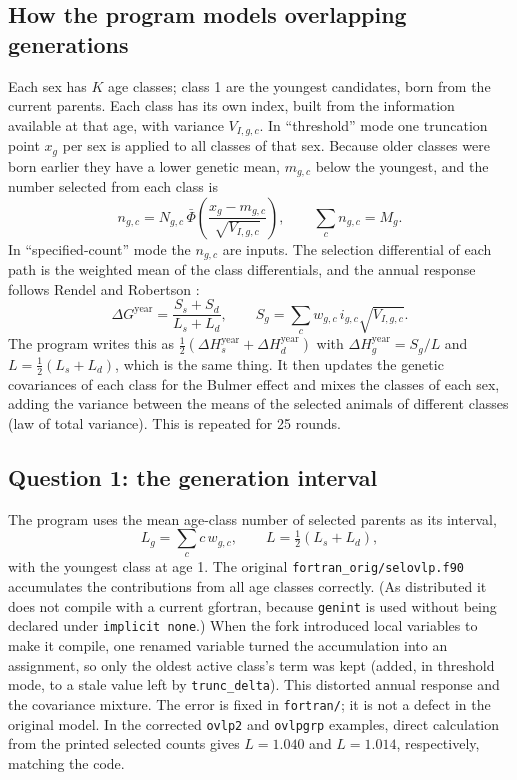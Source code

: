 \documentclass[11pt]{article}
\newcommand{\src}[1]{\texttt{#1}}
\begin{document}
\subsection{How the program models overlapping generations}
Each sex has $K$ age classes; class 1 are the youngest candidates, born from the current parents. Each class has its own index, built from the information available at that age, with variance $V_{I,g,c}$. In ``threshold'' mode one truncation point $x_g$ per sex is applied to all classes of that sex. Because older classes were born earlier they have a lower genetic mean, $m_{g,c}$ below the youngest, and the number selected from each class is
\begin{equation}\label{eq:agecount}
n_{g,c}=N_{g,c}\,\bar\Phi\!\left(\frac{x_g-m_{g,c}}{\sqrt{V_{I,g,c}}}\right),\qquad
\sum_c n_{g,c}=M_g .
\end{equation}
In ``specified-count'' mode the $n_{g,c}$ are inputs. The selection differential of each path is the weighted mean of the class differentials, and the annual response follows Rendel and Robertson \cite{rendel1950}:
\begin{equation}\label{eq:rr}
\Delta G^{\mathrm{year}}=\frac{S_s+S_d}{L_s+L_d},\qquad
S_g=\sum_c w_{g,c}\,i_{g,c}\sqrt{V_{I,g,c}} .
\end{equation}
The program writes this as $\tfrac12(\Delta H_s^{\mathrm{year}}+\Delta H_d^{\mathrm{year}})$ with $\Delta H_g^{\mathrm{year}}=S_g/L$ and $L=\tfrac12(L_s+L_d)$, which is the same thing. It then updates the genetic covariances of each class for the Bulmer effect and mixes the classes of each sex, adding the variance between the means of the selected animals of different classes (law of total variance). This is repeated for 25 rounds.

\subsection{Question 1: the generation interval}
The program uses the mean age-class number of selected parents as its interval,
\begin{equation}\label{eq:interval}
L_g=\sum_c c\,w_{g,c},\qquad L=\tfrac12(L_s+L_d),
\end{equation}
with the youngest class at age 1. The original \src{fortran\_orig/selovlp.f90} accumulates the contributions from all age classes correctly. (As distributed it does not compile with a current gfortran, because \src{genint} is used without being declared under \texttt{implicit none}.) When the fork introduced local variables to make it compile, one renamed variable turned the accumulation into an assignment, so only the oldest active class's term was kept (added, in threshold mode, to a stale value left by \src{trunc\_delta}). This distorted annual response and the covariance mixture. The error is fixed in \src{fortran/}; it is not a defect in the original model. In the corrected \src{ovlp2} and \src{ovlpgrp} examples, direct calculation from the printed selected counts gives $L=1.040$ and $L=1.014$, respectively, matching the code.
\end{document}
